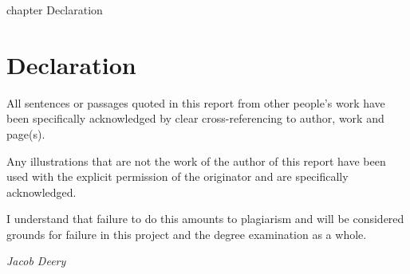 \cleardoublepage
{}
{}
    {chapter}
    {Declaration}

\chapter*{Declaration}
All sentences or passages quoted in this report from other people's work have been specifically acknowledged by clear cross-referencing to author, work and page(s).

Any illustrations that are not the work of the author of this report have been used with the explicit permission of the originator and are specifically acknowledged.

I understand that failure to do this amounts to plagiarism and will be considered grounds for failure in this project and the degree examination as a whole.

\emph{Jacob Deery}
